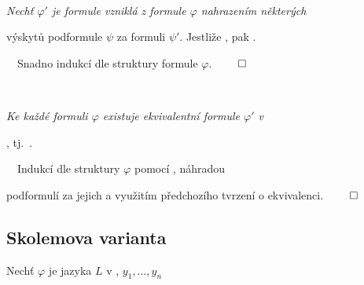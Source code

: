     \ \ {\it Nechť $\varphi'$ je formule vzniklá z formule $\varphi$ nahrazením některých
    \smallskip
    
    výskytů podformule $\psi$ za formuli $\psi'$. Jestliže , pak .}
    \medskip
    
    \ \ Snadno indukcí dle struktury formule $\varphi$. $\qed$
    \bigskip
    
    \ \ {\it Ke každé formuli $\varphi$ existuje ekvivalentní formule $\varphi'$ v 
    \smallskip
    
    , tj.\ .}
    \medskip
    
    \ \ Indukcí dle struktury $\varphi$ pomocí , náhradou
    \smallskip
    
    podformulí za jejich  a využitím předchozího tvrzení o ekvivalenci. $\qed$
    \vspace{-1mm}
    
    
    \vspace{-10mm}
    

\subsection{Skolemova varianta}\todo


Nechť $\varphi$ je  jazyka $L$ v , $y_1,\dots,y_n$
\smallskip

